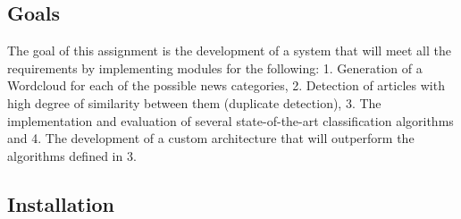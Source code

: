 \subsection{Goals}
The goal of this assignment is the development of a system that will meet all the requirements by implementing modules for the following: 1. Generation of a Wordcloud for each of the possible news categories, 2. Detection of articles with high degree of similarity between them (duplicate detection), 3. The implementation and evaluation of several state-of-the-art classification algorithms and 4. The development of a custom architecture that will outperform the algorithms defined in 3.
\subsection{Installation}